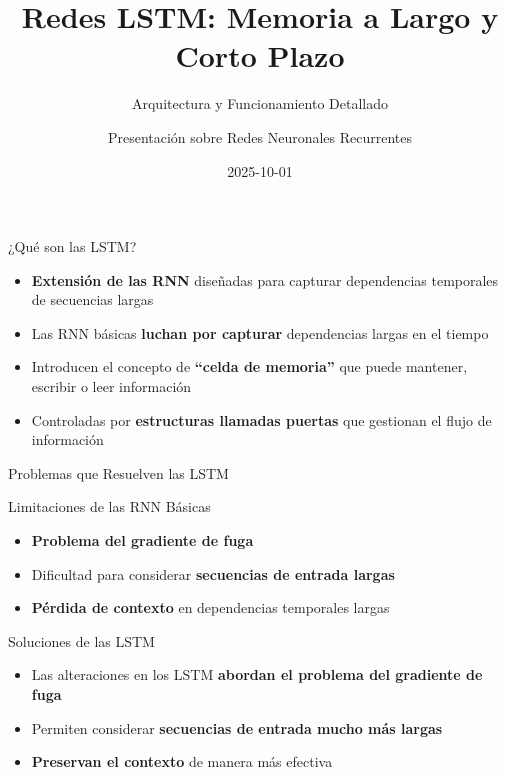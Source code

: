 \documentclass[
  ignorenonframetext,
]{beamer}
\title{Redes LSTM: Memoria a Largo y Corto Plazo}
\subtitle{Arquitectura y Funcionamiento Detallado}
\author{Presentación sobre Redes Neuronales Recurrentes}
\date{2025-10-01}
\providecommand{\tightlist}{%
  \setlength{\itemsep}{0pt}\setlength{\parskip}{0pt}}
\begin{document}
\frame{\titlepage}


\begin{frame}{¿Qué son las LSTM?}
\label{quuxe9-son-las-lstm}
\begin{itemize}
\tightlist
\item
  \textbf{Extensión de las RNN} diseñadas para capturar dependencias
  temporales de secuencias largas
\item
  Las RNN básicas \textbf{luchan por capturar} dependencias largas en el
  tiempo
\item
  Introducen el concepto de \textbf{``celda de memoria''} que puede
  mantener, escribir o leer información
\item
  Controladas por \textbf{estructuras llamadas puertas} que gestionan el
  flujo de información
\end{itemize}
\end{frame}

\begin{frame}{Problemas que Resuelven las LSTM}
\label{problemas-que-resuelven-las-lstm}
\begin{block}{Limitaciones de las RNN Básicas}
\label{limitaciones-de-las-rnn-buxe1sicas}
\begin{itemize}
\tightlist
\item
  \textbf{Problema del gradiente de fuga}
\item
  Dificultad para considerar \textbf{secuencias de entrada largas}
\item
  \textbf{Pérdida de contexto} en dependencias temporales largas
\end{itemize}
\end{block}

\begin{block}{Soluciones de las LSTM}
\label{soluciones-de-las-lstm}
\begin{itemize}
\tightlist
\item
  Las alteraciones en los LSTM \textbf{abordan el problema del gradiente
  de fuga}
\item
  Permiten considerar \textbf{secuencias de entrada mucho más largas}
\item
  \textbf{Preservan el contexto} de manera más efectiva
\end{itemize}
\end{block}
\end{frame}
\end{document}
